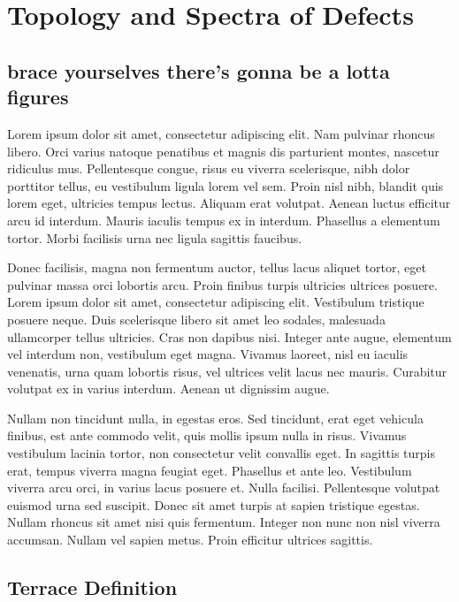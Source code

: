 \chapter{Topology and Spectra of Defects}
\label{ch:topoandspectra}

\section{brace yourselves there's gonna be a lotta figures}

Lorem ipsum dolor sit amet, consectetur adipiscing elit. Nam pulvinar rhoncus libero. Orci varius natoque penatibus et magnis dis parturient montes, nascetur ridiculus mus. Pellentesque congue, risus eu viverra scelerisque, nibh dolor porttitor tellus, eu vestibulum ligula lorem vel sem. Proin nisl nibh, blandit quis lorem eget, ultricies tempus lectus. Aliquam erat volutpat. Aenean luctus efficitur arcu id interdum. Mauris iaculis tempus ex in interdum. Phasellus a elementum tortor. Morbi facilisis urna nec ligula sagittis faucibus.

Donec facilisis, magna non fermentum auctor, tellus lacus aliquet tortor, eget pulvinar massa orci lobortis arcu. Proin finibus turpis ultricies ultrices posuere. Lorem ipsum dolor sit amet, consectetur adipiscing elit. Vestibulum tristique posuere neque. Duis scelerisque libero sit amet leo sodales, malesuada ullamcorper tellus ultricies. Cras non dapibus nisi. Integer ante augue, elementum vel interdum non, vestibulum eget magna. Vivamus laoreet, nisl eu iaculis venenatis, urna quam lobortis risus, vel ultrices velit lacus nec mauris. Curabitur volutpat ex in varius interdum. Aenean ut dignissim augue.

Nullam non tincidunt nulla, in egestas eros. Sed tincidunt, erat eget vehicula finibus, est ante commodo velit, quis mollis ipsum nulla in risus. Vivamus vestibulum lacinia tortor, non consectetur velit convallis eget. In sagittis turpis erat, tempus viverra magna feugiat eget. Phasellus et ante leo. Vestibulum viverra arcu orci, in varius lacus posuere et. Nulla facilisi. Pellentesque volutpat euismod urna sed suscipit. Donec sit amet turpis at sapien tristique egestas. Nullam rhoncus sit amet nisi quis fermentum. Integer non nunc non nisl viverra accumsan. Nullam vel sapien metus. Proin efficitur ultrices sagittis.



\section{Terrace Definition}


